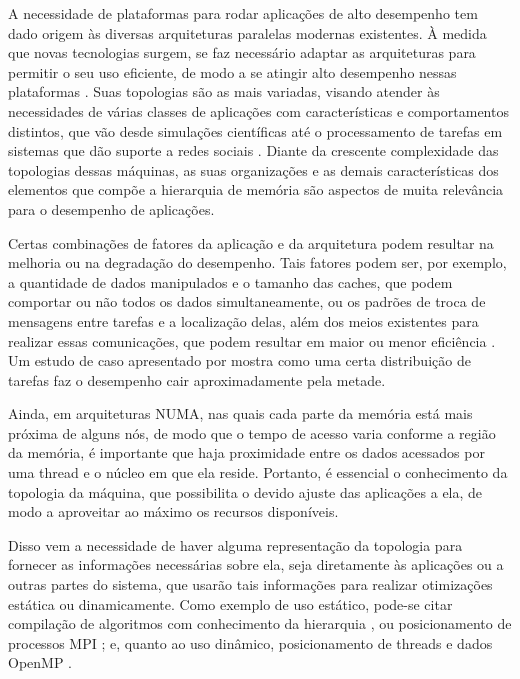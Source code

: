 A necessidade de plataformas para rodar aplicações de alto desempenho tem dado origem às diversas arquiteturas paralelas modernas existentes.
À medida que novas tecnologias surgem, se faz necessário adaptar as arquiteturas
para permitir o seu uso eficiente, de modo a se atingir alto desempenho nessas plataformas \cite{ataque}.
Suas topologias são as mais variadas, visando atender às necessidades de várias classes de aplicações com características e comportamentos distintos, que vão desde simulações científicas até o processamento de tarefas em sistemas que dão suporte a redes sociais \cite{sociais}.
Diante da crescente complexidade das topologias dessas máquinas, as suas organizações e as demais características dos elementos que compõe a hierarquia de memória são aspectos de muita relevância para o desempenho de aplicações.

Certas combinações de fatores da aplicação e da arquitetura podem resultar na melhoria ou na degradação do desempenho.
Tais fatores podem ser, por exemplo, a quantidade de dados manipulados e o tamanho das caches, que podem comportar ou não todos os dados simultaneamente, ou os padrões de troca de mensagens entre tarefas e a localização delas, além dos meios existentes para realizar essas comunicações, que podem resultar em maior ou menor eficiência \cite{Sequoia}. Um estudo de caso apresentado por  mostra como uma certa distribuição de tarefas faz o desempenho cair aproximadamente pela metade.

Ainda, em arquiteturas NUMA, nas quais
cada parte da memória está mais próxima de alguns nós,
de modo que o tempo de acesso varia conforme a região da memória,
é importante que haja proximidade entre os dados acessados por uma thread e o núcleo em que ela reside.
Portanto, é essencial o conhecimento da topologia da máquina, que possibilita o devido ajuste das aplicações a ela, de modo a aproveitar ao máximo os recursos disponíveis.

Disso vem a necessidade de haver alguma representação da topologia para fornecer as informações necessárias sobre ela, seja diretamente às aplicações ou a outras partes do sistema, que usarão tais informações para realizar otimizações estática ou dinamicamente.
Como exemplo de uso estático, pode-se citar compilação de algoritmos com conhecimento da hierarquia \cite{Sequoia}, ou posicionamento de processos MPI \cite{hwloc2010}; e, quanto ao uso dinâmico, posicionamento de threads e dados OpenMP \cite{FGOMP}.

